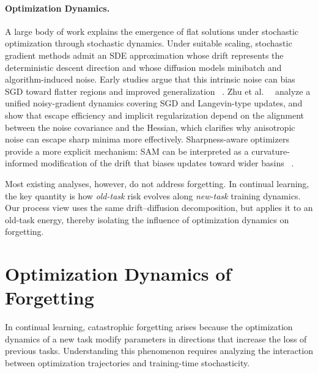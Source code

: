 \documentclass{article}
\begin{document}











\paragraph{Optimization Dynamics.}
A large body of work explains the emergence of flat solutions under stochastic optimization through stochastic dynamics. Under suitable scaling, stochastic gradient methods admit an SDE approximation whose drift represents the deterministic descent direction and whose diffusion models minibatch and algorithm-induced noise. Early studies argue that this intrinsic noise can bias SGD toward flatter regions and improved generalization ~\cite{NIPS2017_81b3833e_SGDgenerlizationbetter,keskar2017largebatchtrainingdeeplearning}. Zhu et al.\ ~\cite{zhu2019anisotropicnoisestochasticgradient} analyze a unified noisy-gradient dynamics covering SGD and Langevin-type updates, and show that escape efficiency and implicit regularization depend on the alignment between the noise covariance and the Hessian, which clarifies why anisotropic noise can escape sharp minima more effectively. Sharpness-aware optimizers provide a more explicit mechanism: SAM can be interpreted as a curvature-informed modification of the drift that biases updates toward wider basins ~\cite{JMLR:v24:23-043}.

Most existing analyses, however, do not address forgetting. In continual learning, the key quantity is how \emph{old-task} risk evolves along \emph{new-task} training dynamics. Our process view uses the same drift--diffusion decomposition, but applies it to an old-task energy, thereby isolating the influence of optimization dynamics on forgetting.





\section{Optimization Dynamics of Forgetting}

In continual learning, catastrophic forgetting arises because the optimization dynamics of a new task modify parameters in directions that increase the loss of previous tasks.
Understanding this phenomenon requires analyzing the interaction between optimization trajectories and training-time stochasticity.
\end{document}
